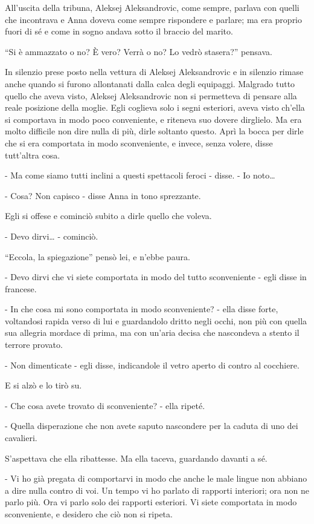 All'uscita della tribuna, Aleksej Aleksandrovic, come sempre, parlava con quelli che incontrava e Anna doveva come sempre rispondere e parlare; ma era proprio fuori di sé e come in sogno andava sotto il braccio del marito. 

``Si è ammazzato o no? È vero? Verrà o no? Lo vedrò stasera?'' pensava. 

In silenzio prese posto nella vettura di Aleksej Aleksandrovic e in silenzio rimase anche quando si furono allontanati dalla calca degli equipaggi. Malgrado tutto quello che aveva visto, Aleksej Aleksandrovic non si permetteva di pensare alla reale posizione della moglie. Egli coglieva solo i segni esteriori, aveva visto ch'ella si comportava in modo poco conveniente, e riteneva suo dovere dirglielo. Ma era molto difficile non dire nulla di più, dirle soltanto questo. Aprì la bocca per dirle che si era comportata in modo sconveniente, e invece, senza volere, disse tutt'altra cosa. 

- Ma come siamo tutti inclini a questi spettacoli feroci - disse. - Io noto\ldots{} 

- Cosa? Non capisco - disse Anna in tono sprezzante. 

Egli si offese e cominciò subito a dirle quello che voleva. 

- Devo dirvi\ldots{} - cominciò. 

``Eccola, la spiegazione'' pensò lei, e n'ebbe paura. 

- Devo dirvi che vi siete comportata in modo del tutto sconveniente - egli disse in francese. 

- In che cosa mi sono comportata in modo sconveniente? - ella disse forte, voltandosi rapida verso di lui e guardandolo dritto negli occhi, non più con quella sua allegria mordace di prima, ma con un'aria decisa che nascondeva a stento il terrore provato. 

- Non dimenticate - egli disse, indicandole il vetro aperto di contro al cocchiere. 

E si alzò e lo tirò su. 

- Che cosa avete trovato di sconveniente? - ella ripeté. 

- Quella disperazione che non avete saputo nascondere per la caduta di uno dei cavalieri. 

S'aspettava che ella ribattesse. Ma ella taceva, guardando davanti a sé. 

- Vi ho già pregata di comportarvi in modo che anche le male lingue non abbiano a dire nulla contro di voi. Un tempo vi ho parlato di rapporti interiori; ora non ne parlo più. Ora vi parlo solo dei rapporti esteriori. Vi siete comportata in modo sconveniente, e desidero che ciò non si ripeta. 

